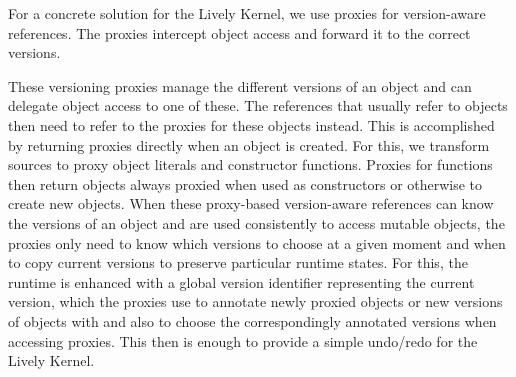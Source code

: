 % 







For a concrete solution for the Lively Kernel, we use proxies for version-aware references.
The proxies intercept object access and forward it to the correct versions.



These versioning proxies manage the different versions of an object and can delegate object access to one of these.
The references that usually refer to objects then need to refer to the proxies for these objects instead. 
This is accomplished by returning proxies directly when an object is created.
For this, we transform sources to proxy object literals and constructor functions.
Proxies for functions then return objects always proxied when used as constructors or otherwise to create new objects.
When these proxy-based version-aware references can know the versions of an object and are used consistently to access mutable objects, the proxies only need to know which versions to choose at a given moment and when to copy current versions to preserve particular runtime states.
For this, the runtime is enhanced with a global version identifier representing the current version, which the proxies use to annotate newly proxied objects or new versions of objects with and also to choose the correspondingly annotated versions when accessing proxies.
This then is enough to provide a simple undo/redo for the Lively Kernel.


